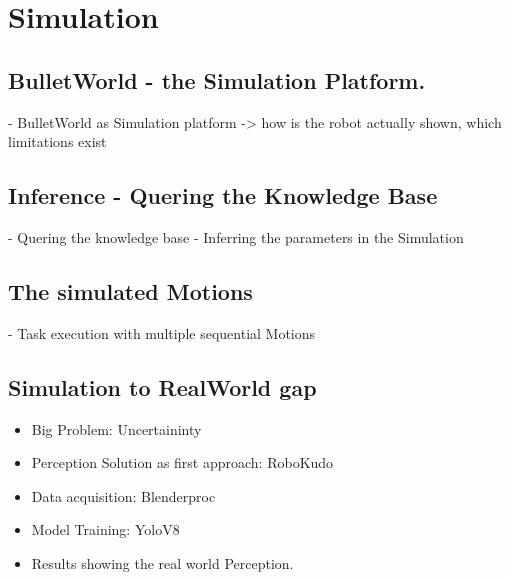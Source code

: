 \chapter*{Simulation}
    \section*{BulletWorld - the Simulation Platform.}
	
		- BulletWorld as Simulation platform -> how is the robot actually shown, which limitations exist
	\section*{Inference - Quering the Knowledge Base}
        - Quering the knowledge base
	    - Inferring the parameters in the Simulation
    \section*{The simulated Motions}
    
	    - Task execution with multiple sequential Motions
	
	\section*{Simulation to RealWorld gap}
	\begin{itemize}
		\item Big Problem: Uncertaininty
		\item Perception Solution as first approach: RoboKudo
		\item Data acquisition: Blenderproc
		\item Model Training: YoloV8
		\item Results showing the real world Perception.
	\end{itemize}